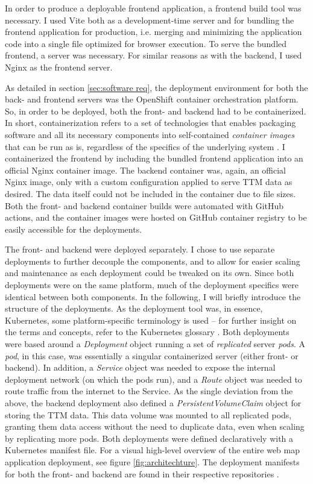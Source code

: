 In order to produce a deployable frontend application,
a frontend build tool was necessary.
I used Vite \parencite{vite} both as a development-time server
and for bundling the frontend application for production,
i.e. merging and minimizing the application code into
a single file optimized for browser execution.
To serve the bundled frontend, a server was necessary.
For similar reasons as with the backend,
I used Nginx \parencite{nginx} as the frontend server.

As detailed in section \ref{sec:software req},
the deployment environment for both the back- and frontend
servers was the OpenShift container orchestration platform.
So, in order to be deployed, both the front- and backend had to be containerized.
In short, containerization refers to a set of technologies
that enables packaging software and all its necessary components
into self-contained \textit{container images} that can be run as is,
regardless of the specifics of the underlying system \parencite{ben2022}.
I containerized the frontend by including the bundled
frontend application into an official Nginx container image.
The backend container was, again, an official Nginx image,
only with a custom configuration applied to serve TTM data as desired.
The data itself could not be included in the container due to file sizes.
Both the front- and backend container builds were automated with GitHub actions,
and the container images were hosted on GitHub container registry
to be easily accessible for the deployments.

The front- and backend were deployed separately.
I chose to use separate deployments to further decouple the components,
and to allow for easier scaling and maintenance as each deployment could be tweaked on its own.
Since both deployments were on the same platform,
much of the deployment specifics were identical between both components.
In the following, I will briefly introduce the structure of the deployments.
As the deployment tool was, in essence, Kubernetes,
some platform-specific terminology is used --
for further insight on the terms and concepts,
refer to the Kubernetes glossary \parencite{kubernetesglossary}.
Both deployments were based around a \textit{Deployment} object
running a set of \textit{replicated} server \textit{pods}.
A \textit{pod}, in this case,
was essentially a singular containerized server (either front- or backend).
In addition, a \textit{Service} object was needed to expose
the internal deployment network (on which the pods run),
and a \textit{Route} object was needed to route traffic from the internet to the Service.
As the single deviation from the above, the backend deployment also defined a
\textit{PersistentVolumeClaim} object for storing the TTM data.
This data volume was mounted to all replicated pods, granting them data access
without the need to duplicate data, even when scaling by replicating more pods.
Both deployments were defined declaratively with a Kubernetes manifest file.
For a visual high-level overview of the entire web map application deployment,
see figure \ref{fig:architechture}.
The deployment manifests for both the front- and backend are found in their respective repositories
.

